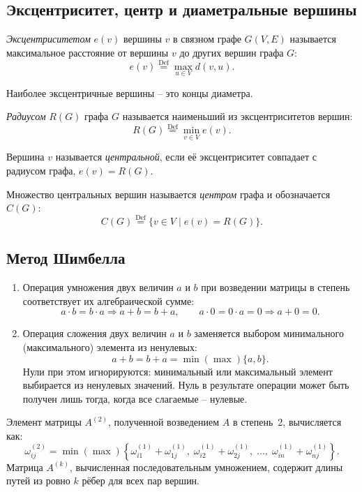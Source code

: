 \subsection{Эксцентриситет, центр и диаметральные вершины}

    \textit{Эксцентриситетом} $e(v)$ вершины $v$ в связном графе
    $G(V, E)$ называется максимальное расстояние от вершины $v$
    до других вершин графа $G$:
    \[
        e(v) \stackrel{\text{Def}}{=} \max_{u \in V} d(v, u).
    \]

    Наиболее эксцентричные вершины -- это концы диаметра.

    \textit{Радиусом} $R(G)$ графа $G$ называется наименьший
    из эксцентриситетов вершин:
    \[
        R(G) \stackrel{\text{Def}}{=} \min_{v \in V} e(v).
    \]

    Вершина $v$ называется \textit{центральной}, если её
    эксцентриситет совпадает с радиусом графа, $e(v) = R(G)$.

    Множество центральных вершин называется \textit{центром}
    графа и обозначается $C(G)$:
    \[
        C(G) \stackrel{\text{Def}}{=} \{v \in V \mid e(v) = R(G)\}.
    \]

\subsection{Метод Шимбелла}

\begin{enumerate}
    \item Операция умножения двух величин $a$ и $b$ при возведении матрицы
    в степень соответствует их алгебраической сумме:
    \begin{equation}
        a \cdot b = b \cdot a \Rightarrow a + b = b + a, \qquad
        a \cdot 0 = 0 \cdot a = 0 \Rightarrow a + 0 = 0.
    \end{equation}

    \item Операция сложения двух величин $a$ и $b$ заменяется выбором
    минимального (максимального) элемента из ненулевых:
    \begin{equation}
        a + b = b + a = \min(\max)\{a, b\}.
    \end{equation}
    Нули при этом игнорируются: минимальный или максимальный элемент
    выбирается из ненулевых значений. Нуль в результате операции может быть
    получен лишь тогда, когда все слагаемые -- нулевые.
\end{enumerate}

Элемент матрицы $A^{(2)}$, полученной возведением $A$ в степень~2,
вычисляется как:
\[
\omega_{ij}^{(2)} = \min(\max) \left\{
    \omega_{i1}^{(1)} + \omega_{1j}^{(1)},\;
    \omega_{i2}^{(1)} + \omega_{2j}^{(1)},\;
    \ldots,\;
    \omega_{in}^{(1)} + \omega_{nj}^{(1)}
\right\}.
\]
Матрица $A^{(k)}$, вычисленная последовательным умножением, содержит длины
путей из ровно $k$ рёбер для всех пар вершин.

